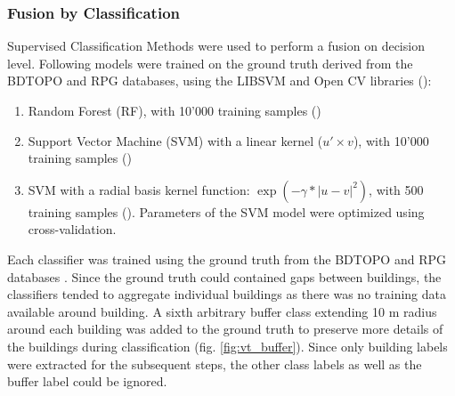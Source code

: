 \documentclass[10pt]{article}
\begin{document}
\subsubsection{Fusion by Classification}
Supervised Classification Methods were used to perform a fusion on decision level. Following models were trained on the ground truth derived from the BDTOPO and RPG databases, using the LIBSVM and Open CV libraries (\cite{bdtopo,RPG,libsvm,opencv}):
\begin{enumerate}
    \item Random Forest (RF), with 10'000 training samples (\cite{opencv})%
    \item Support Vector Machine (SVM) with a linear kernel ($u'\times v$), with 10'000 training samples (\cite{libsvm})
    \item SVM with a radial basis kernel function: $\exp(-\gamma*|u-v|^2)$, with 500 training samples (\cite{libsvm}). Parameters of the SVM model were optimized using cross-validation. %
\end{enumerate}
Each classifier was trained using the ground truth from the BDTOPO and RPG databases \cite{bdtopo,RPG}. Since the ground truth could contained gaps between buildings, the classifiers tended to aggregate individual buildings as there was no training data available around building. A sixth arbitrary buffer class extending 10 m radius around each building was added to the ground truth to preserve more details of the buildings during classification (fig. \ref{fig:vt_buffer}). Since only building labels were extracted for the subsequent steps, the other class labels as well as the buffer label could be ignored.
\end{document}
